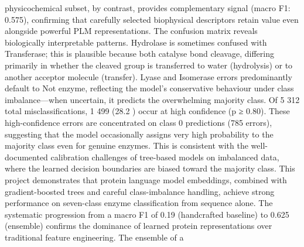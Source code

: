 {}physicochemical subset, by contrast, provides complementary signal (macro F1: 0.575),\markdownRendererSoftLineBreak
{}confirming that carefully selected biophysical descriptors retain value even alongside\markdownRendererSoftLineBreak
{}powerful PLM representations.\markdownRendererInterblockSeparator
{}
\markdownRendererSectionEnd \markdownRendererSectionBegin
{}\markdownRendererInterblockSeparator
{}The confusion matrix reveals biologically interpretable patterns. Hydrolase is sometimes\markdownRendererSoftLineBreak
{}confused with Transferase; this is plausible because both catalyse bond cleavage, differing\markdownRendererSoftLineBreak
{}primarily in whether the cleaved group is transferred to water (hydrolysis) or to another\markdownRendererSoftLineBreak
{}acceptor molecule (transfer). Lyase and Isomerase errors predominantly default to Not enzyme,\markdownRendererSoftLineBreak
{}reflecting the model's conservative behaviour under class imbalance—when uncertain, it\markdownRendererSoftLineBreak
{}predicts the overwhelming majority class.\markdownRendererParagraphSeparator
{}Of 5 312 total misclassifications, 1 499 (28.2 \markdownRendererPercentSign{}) occur at high confidence (p ≥ 0.80).\markdownRendererSoftLineBreak
{}These high-confidence errors are concentrated on class 0 predictions (785 errors), suggesting\markdownRendererSoftLineBreak
{}that the model occasionally assigns very high probability to the majority class even for\markdownRendererSoftLineBreak
{}genuine enzymes. This is consistent with the well-documented calibration challenges of\markdownRendererSoftLineBreak
{}tree-based models on imbalanced data, where the learned decision boundaries are biased toward\markdownRendererSoftLineBreak
{}the majority class.\markdownRendererInterblockSeparator
{}
\markdownRendererSectionEnd 
\markdownRendererSectionEnd \markdownRendererSectionBegin
{}\markdownRendererInterblockSeparator
{}This project demonstrates that protein language model embeddings, combined with\markdownRendererSoftLineBreak
{}gradient-boosted trees and careful class-imbalance handling, achieve strong performance\markdownRendererSoftLineBreak
{}on seven-class enzyme classification from sequence alone. The systematic progression from a\markdownRendererSoftLineBreak
{}macro F1 of 0.19 (handcrafted baseline) to 0.625 (ensemble) confirms the dominance of\markdownRendererSoftLineBreak
{}learned protein representations over traditional feature engineering. The ensemble of a\markdownRendererSoftLineBreak
